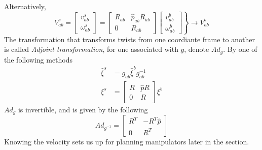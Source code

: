 \documentclass[letterpaper]{article}
\begin{document}
Alternatively, 
\begin{equation*}
  V^{s}_{ab} = \begin{bmatrix}
    v^{s}_{ab}\\\omega^{s}_{ab}
  \end{bmatrix} = 
  \begin{bmatrix}
    R_{ab} & \widehat{p}_{ab}R_{ab}\\
    0 & R_{ab}
  \end{bmatrix}
  \left.\begin{bmatrix}
    v^{b}_{ab}\\\omega^b_{ab}
  \end{bmatrix}\right\}\rightarrow V^{b}_{ab}
\end{equation*}
The transformation that transforms twists from one coordiante frame to another is called
\emph{Adjoint transformation}, for one associated with $g$, denote $Ad_g$.
By one of the following methods
\begin{equation*}
  \begin{split}
    \widehat{\xi}^s & = g_{ab}\widehat{\xi}^bg^{-1}_{ab}\\
    \xi^s & = \begin{bmatrix}
      R & \widehat{p}R \\ 0 & R
    \end{bmatrix} \xi^b
  \end{split}
\end{equation*}
$Ad_g$ is invertible, and is given by the following
\begin{equation*}
  Ad_{g^{-1}} = \begin{bmatrix}
    R^T & -R^T\widehat{p} \\ 0 & R^T
  \end{bmatrix}
\end{equation*}
Knowing the velocity sets us up for planning manipulators later in the section. 
\end{document}
